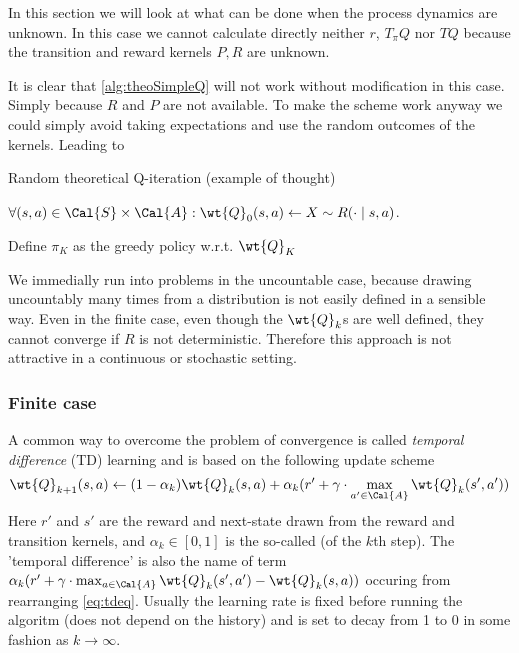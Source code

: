 
In this section we will look at what can be done when the process dynamics
are unknown.
In this case we cannot calculate directly neither $r$, $T_\pi Q$ nor
$TQ$ because the transition and reward kernels $P,R$ are unknown.

It is clear that \cref{alg:theoSimpleQ} will not work without
modification in this case. Simply because $R$ and $P$ are not
available.
To make the scheme work anyway we could simply avoid taking expectations
and use the random outcomes of the kernels.
Leading to

\begin{algorithm}[H] %
  \caption{Random theoretical Q-iteration (example of thought)}
$\forall (s, a) \in \Cal{S} \times \Cal{A} :
\wt{Q}_0(s, a) \leftarrow X \sim R(\cdot \mid s, a)$.

Define $\pi_K$ as the greedy policy w.r.t. $\wt{Q}_K$ \\
\label{alg:theoRandomQ}
\end{algorithm}
We immedially run into problems in the uncountable case, because
drawing uncountably many times from a distribution is not easily
defined in a sensible way.
Even in the finite case, even though the $\wt{Q}_k$s
are well defined, they cannot converge if $R$ is not deterministic.
Therefore this approach is not attractive in a continuous or
stochastic setting.

\subsubsection{Finite case}

A common way to overcome the problem of convergence
is called \emph{temporal difference} (TD) learning and is based on the following
update scheme
\begin{equation}
  \wt{Q}_{k+1}(s, a) \leftarrow (1-\alpha_k) \wt{Q}_k(s, a)
  + \alpha_k (r' + \gamma \cdot \max_{a' \in \Cal{A}} \wt{Q}_k(s', a'))
  \label{eq:tdeq}
\end{equation}
Here $r'$ and $s'$ are the reward and next-state drawn from the
reward and transition kernels,
and $\alpha_k \in [0,1]$ is the so-called 
(of the $k$th step).
The 'temporal difference' is also the name of term
$ \alpha_k ( r' + \gamma \cdot \max_{a \in \Cal{A}} \wt{Q}_k(s', a')
- \wt{Q}_k(s, a) )$ occuring from rearranging \cref{eq:tdeq}.
Usually the learning rate is fixed before running the algoritm
(does not depend on the history) and is set to decay
from 1 to 0 in some fashion as $k \to \infty$.


